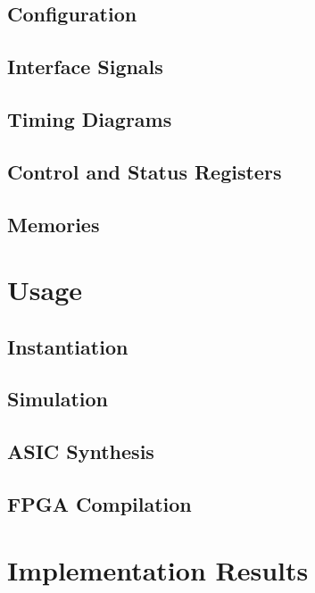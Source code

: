 \documentclass{ug}
\begin{document}
\ifdefined\CONFS
\subsection{Configuration}
\label{sec:ipconfig}

\fi

\subsection{Interface Signals}
\label{sec:ifsig}


\ifdefined\TD
\subsection{Timing Diagrams}
\label{sec:td}

\fi

\ifdefined\CSRS
\subsection{Control and Status Registers}
\label{sec:csrs}

\fi

\ifdefined\MEMS
\subsection{Memories}
\label{sec:mems}

\fi

\ifdefined\SECTIONCLEARPAGE
\clearpage
\fi
\section{Usage}

\subsection{Instantiation}
\label{sec:inst}


\subsection{Simulation}
\label{sec:tbbd}


\ifdefined\ASICSYNTH
\subsection{ASIC Synthesis}
\label{sec:synth}

\fi

\ifdefined\FPGACOMP
\subsection{FPGA Compilation}
\label{sec:fpga}

\fi

\ifdefined\RESULTS
\ifdefined\SECTIONCLEARPAGE
\clearpage
\fi
\section{Implementation Results}
\label{sec:results}

\fi

\ifdefined\CUSTOM

\fi
\end{document}
